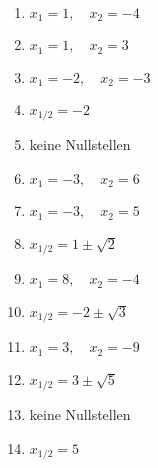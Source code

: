\newpage
\begin{Answer}[ref=normalformNullstellenA1]\\
	\begin{minipage}{\textwidth}
		\begin{minipage}{0.49\textwidth}
			\begin{enumerate}[label=\alph*)]
				\item \(x_1=1,\quad x_2=-4\)
				\item \(x_1=1,\quad x_2=3\)
				\item \(x_1=-2,\quad x_2=-3\)
				\item \(x_{1/2}=-2\)
				\item keine Nullstellen
				\item \(x_1=-3,\quad x_2=6\)
				\item \(x_1=-3,\quad x_2=5\)
			\end{enumerate}
		\end{minipage}
		\begin{minipage}{0.49\textwidth}
			\begin{enumerate}[label=\alph*)]
				\setcounter{enumi}{7}
				\item \(x_{1/2}=1\pm\sqrt{2}\)
				\item \(x_1=8,\quad x_2=-4\)
				\item \(x_{1/2}=-2\pm\sqrt{3}\)
				\item \(x_1=3,\quad x_2=-9\)
				\item \(x_{1/2}=3\pm\sqrt{5}\)
				\item keine Nullstellen
				\item \(x_{1/2}=5\)
			\end{enumerate}
		\end{minipage}
	\end{minipage}
\end{Answer}